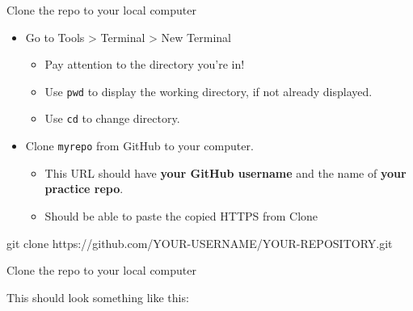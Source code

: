 \documentclass[
  ignorenonframetext,
]{beamer}
\newenvironment{Shaded}{\begin{snugshade}}{\end{snugshade}}
\newcommand{\ExtensionTok}[1]{#1}
\newcommand{\FunctionTok}[1]{\textcolor[rgb]{0.00,0.00,0.00}{#1}}
\newcommand{\KeywordTok}[1]{\textcolor[rgb]{0.13,0.29,0.53}{\textbf{#1}}}
\newcommand{\NormalTok}[1]{#1}
\newcommand{\StringTok}[1]{\textcolor[rgb]{0.31,0.60,0.02}{#1}}
\providecommand{\tightlist}{%
  \setlength{\itemsep}{0pt}\setlength{\parskip}{0pt}}
\begin{document}
\begin{frame}[fragile]{Clone the repo to your local computer}
\protect\hypertarget{clone-the-repo-to-your-local-computer-1}{}

\begin{itemize}
\tightlist
\item
  Go to Tools \textgreater{} Terminal \textgreater{} New Terminal

  \begin{itemize}
  \tightlist
  \item
    Pay attention to the directory you're in!
  \item
    Use \texttt{pwd} to display the working directory, if not already
    displayed.
  \item
    Use \texttt{cd} to change directory.
  \end{itemize}
\item
  Clone \texttt{myrepo} from GitHub to your computer.

  \begin{itemize}
  \tightlist
  \item
    This URL should have \textbf{your GitHub username} and the name of
    \textbf{your practice repo}.
  \item
    Should be able to paste the copied HTTPS from Clone
  \end{itemize}
\end{itemize}

\begin{Shaded}
\begin{Highlighting}[]
\FunctionTok{git}\NormalTok{ clone https://github.com/YOUR-USERNAME/YOUR-REPOSITORY.git}
\end{Highlighting}
\end{Shaded}

\end{frame}

\begin{frame}[fragile]{Clone the repo to your local computer}
\protect\hypertarget{clone-the-repo-to-your-local-computer-2}{}

This should look something like this:

\begin{Shaded}
\end{Shaded}

\end{frame}
\end{document}
